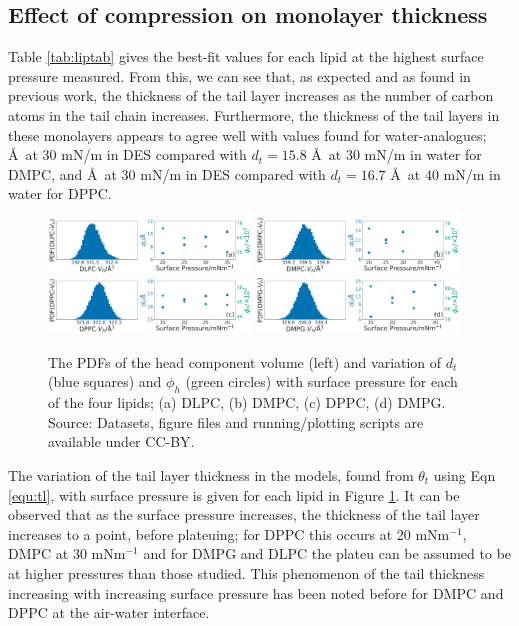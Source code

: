 \documentclass[twoside,twocolumn,9pt]{article}
\begin{document}
\subsection{Effect of compression on monolayer thickness}
Table \ref{tab:liptab} gives the best-fit values for each lipid at the highest surface pressure measured. From this, we can see that, as expected and as found in previous work,\cite{Mohwald1990,Vaknin1991} the thickness of the tail layer increases as the number of carbon atoms in the tail chain increases. Furthermore, the thickness of the tail layers in these monolayers appears to agree well with values found for water-analogues; \AA\ at 30 mN/m in DES compared with $d_t=15.8$ \AA\ at 30 mN/m\cite{Johnson1991} in water for DMPC, and \AA\ at 30 mN/m in DES compared with $d_t=16.7$ \AA\ at 40 mN/m\cite{Helm1987} in water for DPPC.

%
\begin{figure}
	\centering
	\includegraphics[width=0.48\textwidth]{figures/DLPC_other_data}
	\includegraphics[width=0.48\textwidth]{figures/DMPC_other_data}
	\includegraphics[width=0.48\textwidth]{figures/DPPC_other_data}
	\includegraphics[width=0.48\textwidth]{figures/DMPG_other_data}
	\caption{The PDFs of the head component volume (left) and variation of $d_t$ (blue squares) and $\phi_h$ (green circles) with surface pressure for each of the four lipids; (a) DLPC, (b) DMPC, (c) DPPC, (d) DMPG. Source: Datasets, figure files and running/plotting scripts are available under CC-BY.\cite{mccluskey_2018}}
	\label{fig:lipresults}
\end{figure}
%
The variation of the tail layer thickness in the models, found from $\theta_t$ using Eqn \ref{equ:tl}, with surface pressure is given for each lipid in Figure \ref{fig:lipresults}. It can be observed that as the surface pressure increases, the thickness of the tail layer increases to a point, before plateuing; for DPPC this occurs at 20 mNm$^{-1}$, DMPC at 30 mNm$^{-1}$ and for DMPG and DLPC the plateu can be assumed to be at higher pressures than those studied. This phenomenon of the tail thickness increasing with increasing surface pressure has been noted before for DMPC\cite{Bayerl1990} and DPPC\cite{Campbell2018} at the air-water interface.
\end{document}
